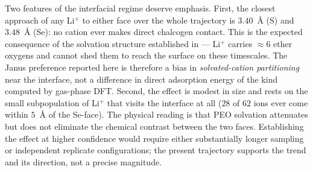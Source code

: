Two features of the interfacial regime deserve emphasis. First, the closest approach of any Li$^+$ to either face over the whole trajectory is $3.40$~\AA{} (S) and $3.48$~\AA{} (Se): no cation ever makes direct chalcogen contact. This is the expected consequence of the solvation structure established in  --- Li$^+$ carries $\approx6$ ether oxygens and cannot shed them to reach the surface on these timescales. The Janus preference reported here is therefore a bias in \emph{solvated-cation partitioning} near the interface, not a difference in direct adsorption energy of the kind computed by gas-phase DFT. Second, the effect is modest in size and rests on the small subpopulation of Li$^+$ that visits the interface at all ($28$ of $62$ ions ever come within $5$~\AA{} of the Se-face). The physical reading is that PEO solvation attenuates but does not eliminate the chemical contrast between the two faces. Establishing the effect at higher confidence would require either substantially longer sampling or independent replicate configurations; the present trajectory supports the trend and its direction, not a precise magnitude.



